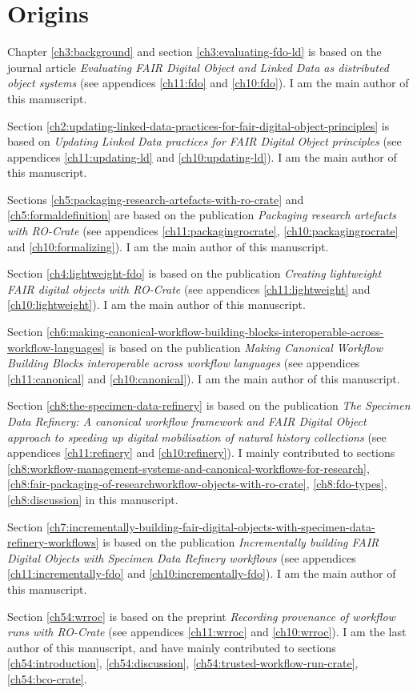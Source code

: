 \section{Origins}
\label{intro:origins}

Chapter \ref{ch3:background} and section \ref{ch3:evaluating-fdo-ld} is based on the journal article \emph{Evaluating FAIR Digital Object and Linked Data as distributed object systems} \cite{soilandreyes2023c}  (see appendices \ref{ch11:fdo} and \ref{ch10:fdo}). I am the main author of this manuscript.

Section \ref{ch2:updating-linked-data-practices-for-fair-digital-object-principles} is based on \emph{Updating Linked Data practices for FAIR Digital Object principles} \cite{10.3897/rio.8.e94501} (see appendices \ref{ch11:updating-ld} and \ref{ch10:updating-ld}). I am the main author of this manuscript.

Sections \ref{ch5:packaging-research-artefacts-with-ro-crate} and \ref{ch5:formaldefinition} are based on the publication \emph{Packaging research artefacts with RO-Crate} \cite{Soiland-Reyes 2022} (see appendices \ref{ch11:packagingrocrate}, \ref{ch10:packagingrocrate} and \ref{ch10:formalizing}). I am the main author of this manuscript.

Section \ref{ch4:lightweight-fdo} is based on the publication \emph{Creating lightweight FAIR digital objects with RO-Crate} \cite{10.3897/rio.8.e93937} (see appendices \ref{ch11:lightweight} and \ref{ch10:lightweight}). I am the main author of this manuscript.

Section \ref{ch6:making-canonical-workflow-building-blocks-interoperable-across-workflow-languages} is based on the publication \emph{Making Canonical Workflow Building Blocks interoperable across workflow languages} \cite{Soiland-Reyes 2022b} (see appendices \ref{ch11:canonical} and \ref{ch10:canonical}). I am the main author of this manuscript.

Section \ref{ch8:the-specimen-data-refinery} is based on the publication \emph{The Specimen Data Refinery: A
canonical workflow framework and FAIR Digital Object approach to speeding up digital mobilisation of natural history collections} \cite{Hardisty 2022} (see appendices \ref{ch11:refinery} and \ref{ch10:refinery}). I mainly contributed to sections \ref{ch8:workflow-management-systems-and-canonical-workflows-for-research}, \ref{ch8:fair-packaging-of-researchworkflow-objects-with-ro-crate}, \ref{ch8:fdo-types}, \ref{ch8:discussion} in this manuscript.

Section \ref{ch7:incrementally-building-fair-digital-objects-with-specimen-data-refinery-workflows} is based on the publication \emph{Incrementally building FAIR Digital Objects with Specimen Data
Refinery workflows} \cite{Woolland 2022} (see appendices \ref{ch11:incrementally-fdo} and \ref{ch10:incrementally-fdo}). I am the main author of this manuscript.

Section \ref{ch54:wrroc} is based on the preprint \emph{
Recording provenance of workflow runs with RO-Crate} \cite{workflow-run-crate} (see appendices \ref{ch11:wrroc} and \ref{ch10:wrroc}). I am the last author of this manuscript, and have mainly contributed to sections \ref{ch54:introduction}, \ref{ch54:discussion}, \ref{ch54:trusted-workflow-run-crate}, \ref{ch54:bco-crate}.
